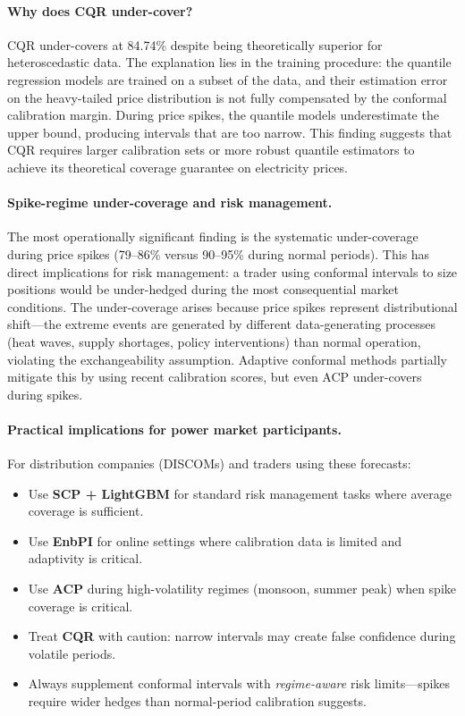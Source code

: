 \documentclass[preprint,12pt]{elsarticle}
\begin{document}
\begin{enumerate}
\paragraph{Why does CQR under-cover?}
CQR under-covers at 84.74\% despite being theoretically superior for heteroscedastic data. The explanation lies in the training procedure: the quantile regression models are trained on a subset of the data, and their estimation error on the heavy-tailed price distribution is not fully compensated by the conformal calibration margin. During price spikes, the quantile models underestimate the upper bound, producing intervals that are too narrow. This finding suggests that CQR requires larger calibration sets or more robust quantile estimators to achieve its theoretical coverage guarantee on electricity prices.

\paragraph{Spike-regime under-coverage and risk management.}
The most operationally significant finding is the systematic under-coverage during price spikes (79--86\% versus 90--95\% during normal periods). This has direct implications for risk management: a trader using conformal intervals to size positions would be under-hedged during the most consequential market conditions. The under-coverage arises because price spikes represent distributional shift---the extreme events are generated by different data-generating processes (heat waves, supply shortages, policy interventions) than normal operation, violating the exchangeability assumption. Adaptive conformal methods \citep{gibbs2021} partially mitigate this by using recent calibration scores, but even ACP under-covers during spikes.

\paragraph{Practical implications for power market participants.}
For distribution companies (DISCOMs) and traders using these forecasts:
\begin{itemize}
  \item Use \textbf{SCP + LightGBM} for standard risk management tasks where average coverage is sufficient.
  \item Use \textbf{EnbPI} for online settings where calibration data is limited and adaptivity is critical.
  \item Use \textbf{ACP} during high-volatility regimes (monsoon, summer peak) when spike coverage is critical.
  \item Treat \textbf{CQR} with caution: narrow intervals may create false confidence during volatile periods.
  \item Always supplement conformal intervals with \emph{regime-aware} risk limits---spikes require wider hedges than normal-period calibration suggests.
\end{itemize}


\end{enumerate}
\end{document}
